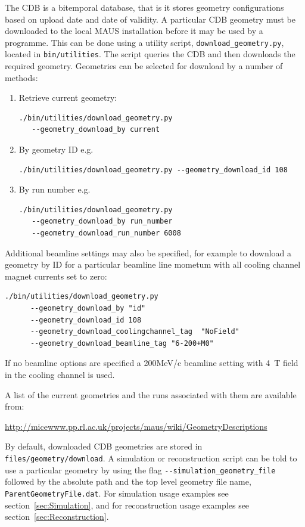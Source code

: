 \documentclass[a4paper,10pt]{article}
\begin{document}
The CDB is a bitemporal database, that is it stores geometry configurations based on upload date and date of validity.  A particular CDB geometry must be downloaded to the local MAUS installation before it may be used by a programme.  This can be done using a utility script, \texttt{download\_geometry.py}, located in \texttt{bin/utilities}.  The script queries the CDB and then downloads the required geometry.  Geometries can be selected for download by a number of methods:

\begin{enumerate}
  \item Retrieve current geometry:
  \begin{lstlisting}
./bin/utilities/download_geometry.py
   --geometry_download_by current
  \end{lstlisting}
  \item By geometry ID  e.g. 
    \begin{lstlisting}
./bin/utilities/download_geometry.py --geometry_download_id 108
    \end{lstlisting}
  \item By run number e.g.
  \begin{lstlisting}
./bin/utilities/download_geometry.py
   --geometry_download_by run_number
   --geometry_download_run_number 6008
  \end{lstlisting}
\end{enumerate}

Additional beamline settings may also be specified, for example to download a geometry by ID for a particular beamline line mometum with all cooling channel magnet currents set to zero:

\begin{lstlisting}
./bin/utilities/download_geometry.py 
      --geometry_download_by "id" 
      --geometry_download_id 108
      --geometry_download_coolingchannel_tag  "NoField" 
      --geometry_download_beamline_tag "6-200+M0" 
\end{lstlisting}

If no beamline options are specified a 200MeV/c beamline setting with 4~T field in the cooling channel is used.

A list of the current geometries and the runs associated with them are available from:

    \medskip
    \url{http://micewww.pp.rl.ac.uk/projects/maus/wiki/GeometryDescriptions}
    \medskip

By default, downloaded CDB geometries are stored in \texttt{files/geometry/download}.  A simulation or reconstruction script can be told to use a particular geometry by using the flag \texttt{-{}-simulation\_geometry\_file} followed by the absolute path and the top level geometry file name, \texttt{ParentGeometryFile.dat}. For simulation usage examples see section~\ref{sec:Simulation}, and for reconstruction usage examples see section~\ref{sec:Reconstruction}.
\end{document}
